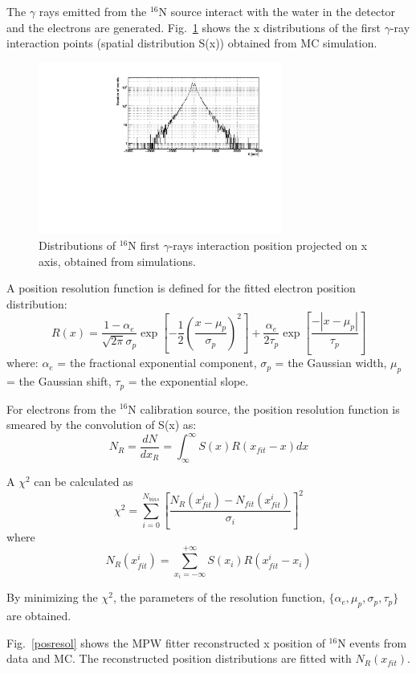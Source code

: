 \documentclass[preprint,12pt]{elsarticle}
\numberwithin{equation}{section}
\begin{document}
The $\gamma$ rays emitted from the $^{16}$N source interact with the water in the detector and the electrons are generated. Fig.~\ref{hsx} shows the x distributions of the first $\gamma$-ray interaction points (spatial distribution S(x)) obtained from MC simulation.

\begin{figure}[!htb]
	\centering
	\includegraphics[width=8cm]{sx.pdf}
	\caption{Distributions of {$^{16}$}N first $\gamma$-rays interaction position projected on x axis, obtained from simulations.}
	\label{hsx}
\end{figure}

A position resolution function is defined for the fitted electron position distribution\cite{boulay}:
\[
  R(x)=\frac{1-\alpha_e}{\sqrt{2\pi}\sigma_p}\exp{[-\frac{1}{2}(\frac{x-\mu_p}{\sigma_p})^2]+\frac{\alpha_e}{2\tau_p}\exp{[\frac{-|x-\mu_p|}{\tau_p}]}}
\]
where: $\alpha_e$ = the fractional exponential component, $\sigma_p$ =
the Gaussian width, $\mu_p$ = the Gaussian shift, $\tau_p$ = the
exponential slope.

For electrons from the $^{16}$N calibration source, the position resolution function is smeared by the convolution of S(x) as:
\[
  N_{R}=\frac{dN}{dx_R}=\int^\infty_\infty S(x)R(x_{fit}-x)dx
\]

A $\chi^2$ can be calculated as
\[
  \chi^2=\sum^{N_{bins}}_{i=0}[\frac{N_R(x_{fit}^i)-N_{fit}(x_{fit}^i)}{\sigma_i}]^2
\]
where
\[N_R(x_{fit}^i)=\sum_{x_i=-\infty}^{+\infty}S(x_i)R(x_{fit}^i-x_i)\]

By minimizing the $\chi^2$, the parameters of the resolution function, $\{\alpha_e,\mu_p,\sigma_p,\tau_p\}$ are obtained.

Fig.~\ref{posresol} shows the MPW fitter reconstructed x position of {$^{16}$}N events from data and MC. The reconstructed position distributions are fitted with $N_R(x_{fit})$.
\end{document}
